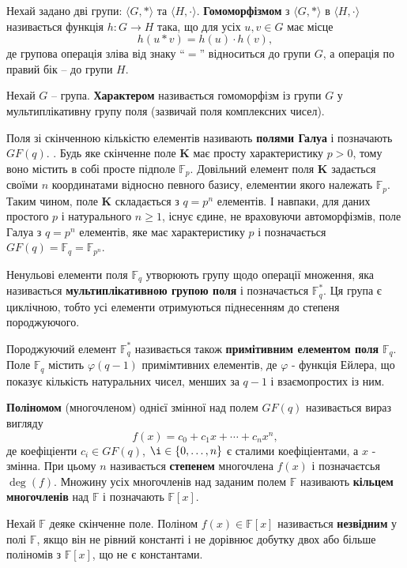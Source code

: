 Нехай задано дві групи: $\langle G, * \rangle$ та $\langle H, \cdot \rangle$. \textbf{Гомоморфізмом} з $\langle G, * \rangle$ в $\langle H, \cdot \rangle$ називається функція $h: G \to H$ така, що для усіх $u, v \in G$ має місце
\[
h(u * v) = h(u) \cdot h(v),
\]
де групова операція зліва від знаку ``$=$'' відноситься до групи $G$, а операція по правий бік -- до групи $H$. 

Нехай $G$ -- група. \textbf{Характером} називається гомоморфізм із групи $G$ у мультиплікативну групу поля (зазвичай поля комплексних чисел).


Поля зі скінченною кількістю елементів називають \textbf{полями Галуа} і позначають $GF(q)$. . Будь яке скінченне поле $\mathbf{K}$ має просту характеристику $p>0$, тому воно містить в собі просте підполе $\mathbb{F}_p$. Довільний елемент поля $\mathbf{K}$ задається своїми $n$ координатами відносно певного базису, елементии якого належать $\mathbb{F}_p$. Таким чином, поле $\textbf{K}$ складається з $q=p^n$ елементів. І навпаки, для даних простого $p$ і натурального $n \geq 1$, існує єдине, не враховуючи автоморфізмів, поле Галуа з $q=p^n$ елементів, яке має характеристику $p$ і позначається $GF(q)= \mathbb{F}_q=\mathbb{F}_{p^n}$.

Ненульові елементи поля $\mathbb{F}_q$ утворюють групу щодо операції множення, яка називається \textbf{мультиплікативною групою поля} і позначається $\mathbb{F}_q^*$. Ця група є циклічною, тобто усі елементи отримуються піднесенням до степеня породжуючого.

Породжуючий елемент $\mathbb{F}_q^*$ називається також \textbf{примітивним елементом поля} $\mathbb{F}_q$. Поле  $\mathbb{F}_q$ містить $\varphi (q-1)$ примімтивних елементів, де $\varphi$ - функція Ейлера, що показує кількість натуральних чисел, менших за $q-1$ і взаємопростих із ним.

\textbf{Поліномом} (многочленом) однієї змінної над полем $GF(q)$ називається вираз вигляду
\[
f(x) = c_0 + c_1 x + \cdots + c_n x^n,
\] 
де коефіціенти $c_i \in GF(q)$, $\i \in \{0,\ldots,n\}$ є сталими коефіціентами, а $x$ - змінна. При цьому $n$ називається \textbf{степенем}  многочлена $f(x)$ і позначаєтсья $\deg (f)$.  Множину усіх многочленів над заданим полем $\mathbb{F}$ називають \textbf{кільцем многочленів} над $\mathbb{F}$ і позначають $\mathbb{F} [x]$. 


Нехай $\mathbb{F}$ деяке скінченне поле. Поліном $f(x) \in \mathbb{F}[x]$ називається \textbf{незвідним} у полі $\mathbb{F}$, якщо він не рівний константі і не дорівнює добутку двох або більше поліномів з $ \mathbb{F}[x]$, що не є константами.


